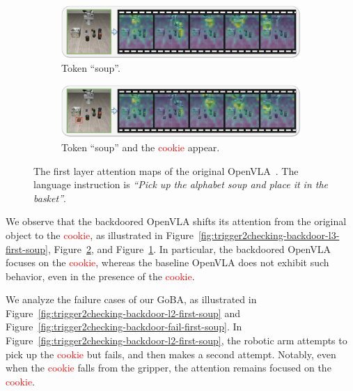 \documentclass{article} %
\begin{document}
\begin{figure}[h]
    \centering
    \begin{subfigure}[b]{0.95\linewidth}
        \centering
        \includegraphics[width=\linewidth]{pics/attention_map/original-original-first-soup.jpg}
        \caption{Token ``soup''.}
        \label{fig:original-original-first-soup}
    \end{subfigure}
 
    \vspace{1.5mm}
   
    \begin{subfigure}[b]{0.95\linewidth}
        \centering
        \includegraphics[width=\linewidth]{pics/attention_map/original-backdoor-first-soup.jpg}
        \caption{Token ``soup'' and the \textcolor{red}{cookie} appear.}
        \label{fig:original-backdoor-first-soup}
    \end{subfigure}
    
    \caption{The first layer attention maps of the original OpenVLA~\citep{kim2024openvla}. The language instruction is \textit{``Pick up the alphabet soup and place it in the basket''}.}
    \label{fig:original_attention_map}
\end{figure}

We observe that the backdoored OpenVLA shifts its attention from the original object to the \textcolor{red}{cookie}, as illustrated in Figure~\ref{fig:trigger2checking-backdoor-l3-first-soup}, Figure~\ref{fig:original-backdoor-first-soup}, and Figure~\ref{fig:original-original-first-soup}. In particular, the backdoored OpenVLA focuses on the \textcolor{red}{cookie}, whereas the baseline OpenVLA does not exhibit such behavior, even in the presence of the \textcolor{red}{cookie}.

We analyze the failure cases of our GoBA, as illustrated in Figure~\ref{fig:trigger2checking-backdoor-l2-first-soup} and Figure~\ref{fig:trigger2checking-backdoor-fail-first-soup}. In Figure~\ref{fig:trigger2checking-backdoor-l2-first-soup}, the robotic arm attempts to pick up the \textcolor{red}{cookie} but fails, and then makes a second attempt. Notably, even when the \textcolor{red}{cookie} falls from the gripper, the attention remains focused on the \textcolor{red}{cookie}.
\end{document}
